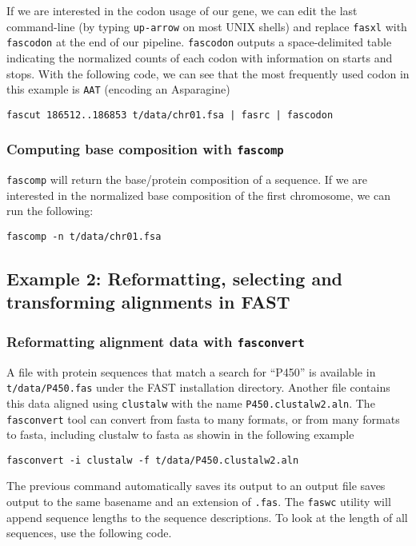 \documentclass[11pt]{article}
\begin{document}
If we are interested in the codon usage of our gene, we can edit the
last command-line (by typing \texttt{up-arrow} on most UNIX shells) and
replace \texttt{fasxl} with \texttt{fascodon} at the end of our pipeline. \texttt{fascodon}
outputs a space-delimited table indicating the normalized counts of
each codon with information on starts and stops. With the following
code, we can see that the most frequently used codon in this example
is \texttt{AAT} (encoding an Asparagine)

\begin{verbatim}
fascut 186512..186853 t/data/chr01.fsa | fasrc | fascodon
\end{verbatim}
\subsubsection{Computing base composition with \texttt{fascomp}}
\label{sec-2_2_6}


\texttt{fascomp} will return the base/protein composition of a sequence. If
we are interested in the normalized base composition of the first
chromosome, we can run the following:

\begin{verbatim}
fascomp -n t/data/chr01.fsa
\end{verbatim}
\subsection{Example 2: Reformatting, selecting and transforming alignments in FAST}
\label{sec-2_3}
\subsubsection{Reformatting alignment data with \texttt{fasconvert}}
\label{sec-2_3_1}


A file with protein sequences that match a search for ``P450'' is
available in \texttt{t/data/P450.fas} under the FAST installation
directory. Another file contains this data aligned using \texttt{clustalw}
with the name \texttt{P450.clustalw2.aln}. The \texttt{fasconvert} tool can convert
from fasta to many formats, or from many formats to fasta, including
clustalw to fasta as showin in the following example

\begin{verbatim}
fasconvert -i clustalw -f t/data/P450.clustalw2.aln
\end{verbatim}

The previous command automatically saves its output to an output file
saves output to the same basename and an extension of \texttt{.fas}. The
\texttt{faswc} utility will append sequence lengths to the sequence
descriptions. To look at the length of all sequences, use the
following code.
\end{document}
